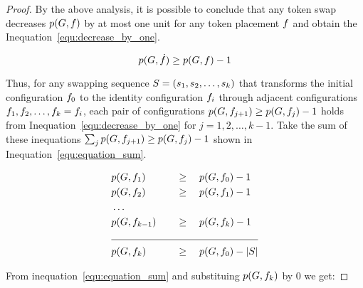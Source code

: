 \documentclass[msc,english,table,xcdraw]{ppgccufmg}
\begin{document}
\begin{proof}
    By the above analysis, it is possible to conclude that any token swap decreases
    $p(G, f)$ by at most one unit for any token placement $f$ and
    obtain the Inequation~\ref{equ:decrease_by_one}.
    
    \begin{equation}
        \centering
        \label{equ:decrease_by_one}
        \applyFunc{p}{\graphG, \sub{\mapFunc}} \geq \applyFunc{p}{\graphG, \mapFunc} - 1
    \end{equation}
    
    Thus, for any swapping sequence $S = (s_1, s_2, \ldots, 
    s_k)$ that transforms the initial configuration $f_{0}$ to the identity
    configuration $f_{i}$ through adjacent configurations $f_{1}, f_2,
    \ldots, f_{k} = f_{i}$, each pair of configurations $p(G, 
    f_{j+1}) \geq p(G, f_{j}) -1$ holds from 
    Inequation~\ref{equ:decrease_by_one} for $j = 1,2,\ldots,k-1$.
    Take the sum of these inequations $\sum_{j} p(G, f_{j+1}) \geq p(G, f_{j}) -1$ shown in Inequation~\ref{equ:equation_sum}.
    
    \begin{alignat}{2}
    \centering
    \label{equ:equation_sum}
    & \applyFunc{p}{\graphG, \mapFunc_{1}}  \quad && \geq \quad \applyFunc{p}{\graphG, \mapFunc_{0}} -1 \nonumber \\
    & \applyFunc{p}{\graphG, \mapFunc_{2}} \quad && \geq \quad \applyFunc{p}{\graphG, \mapFunc_{1}} -1 \nonumber \\
    & \ldots \nonumber \\
    & \applyFunc{p}{\graphG, \mapFunc_{k-1}} \quad && \geq \quad \applyFunc{p}{\graphG, \mapFunc_{k}} -1 \nonumber \\
    \cline{1-4}
    & \applyFunc{p}{\graphG, \mapFunc_{k}} \quad && \geq \quad \applyFunc{p}{\graphG, \mapFunc_{0}} - \sizeof{\swapSeq}
    \end{alignat}
    
    From inequation~\ref{equ:equation_sum} and substituing $p(G, f_{k})$ by 0 we get:
    
    

\end{proof}
\end{document}
